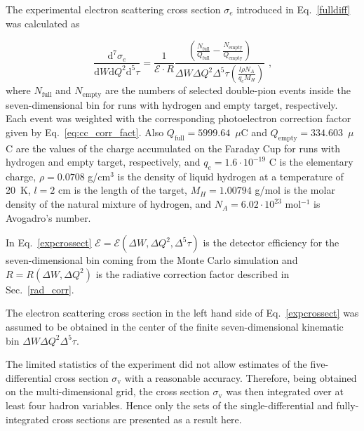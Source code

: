 \documentclass[prc,twocolumn,superscriptaddress,showpacs,amssymb,amsmath,amsfonts,aps,nofootinbib]{revtex4-1}
\begin{document}
The experimental electron scattering cross section $\sigma_{e}$ introduced in Eq.~\eqref{fulldiff} was calculated as
  
 
\begin{equation}
\frac{\textrm{d}^{7}\sigma_{e}}{\textrm{d}W\textrm{d}Q^{2}\textrm{d}^{5}\tau} = \frac{1}{\mathcal{E} \cdot R} 
\frac{\left( \frac{N_{\text{full}}}{Q_{\text{full}}}-\frac{N_{\text{empty}}}{Q_{\text{empty}}} \right)}{
\Delta W \Delta Q^{2} \Delta^{5} \tau \left( \frac{l \rho N_{A}}{q_{e}M_{H}} \right)} \textrm{ ,}
\label{expcrossect}
\end{equation}
where $N_{\text{full}}$ and $N_{\text{empty}}$ are the numbers of selected double-pion events inside the
seven-dimensional bin for runs with hydrogen and
empty target, respectively. 
Each event was weighted with the corresponding photoelectron correction factor given by Eq.~\eqref{eq:cc_corr_fact}.
Also  $Q_{\text{full}}= 5999.64$~$\mu$C and $Q_{\text{empty}} = 334.603$~$\mu$C are the  values of the charge accumulated on the Faraday Cup for runs with hydrogen and empty target, respectively, and $q_{e} =1.6 \cdot 10^{-19}$ C is the elementary charge, $\rho = 0.0708$  g/cm$^{3}$ is the density of liquid hydrogen at a temperature of 20~K,
$l = 2$ cm is the length of the target, $M_{H} = 1.00794$ g/mol is the molar density of
the natural mixture of hydrogen, and  $N_{A} =6.02 \cdot 10^{23}$ mol$^{-1}$ is Avogadro's
number.

In Eq.~\eqref{expcrossect}  $\mathcal{E} = \mathcal{E}(\Delta W, \Delta Q^{2}, \Delta^{5} \tau)$ is the detector efficiency for the seven-dimensional bin coming from the  Monte Carlo simulation and $R = R(\Delta W, \Delta Q^{2})$ is the
radiative correction factor described in Sec.~\ref{rad_corr}. 

The electron scattering cross section in the left hand side of Eq.~\eqref{expcrossect} was assumed to be obtained in the center of the finite seven-dimensional kinematic bin $\Delta W \Delta Q^{2} \Delta^{5} \tau$.





The limited
statistics of the experiment did not allow estimates
of the five-differential cross section $\sigma_{\text{v}}$ with a reasonable
accuracy. Therefore, being obtained on the multi-dimensional grid, the cross section $\sigma_{\text{v}}$ was then integrated over at least four hadron variables. Hence only the sets of the single-differential and fully-integrated cross sections are presented as a result here.
\end{document}
